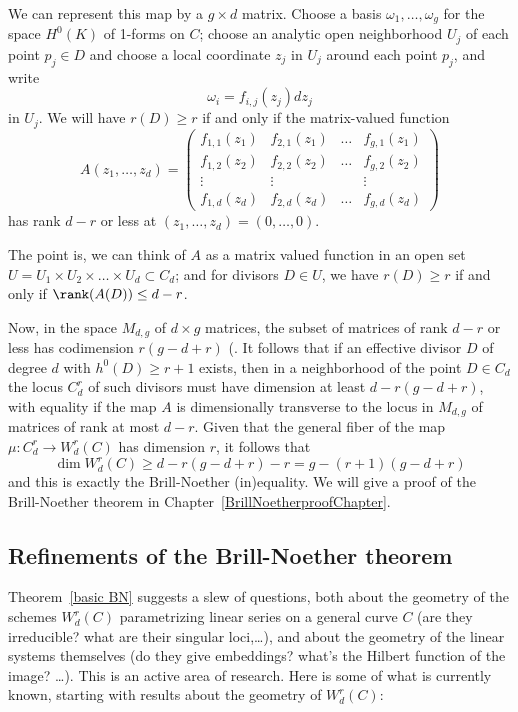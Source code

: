 We can represent this map by a $g \times d$ matrix. Choose a basis $\omega_1,\dots,\omega_g$ for the space $H^0(K)$ of 1-forms on $C$; choose an analytic open neighborhood $U_j$ of each point $p_j \in D$ and choose a local coordinate $z_j$ in $U_j$ around each point $p_j$, and write
$$
\omega_i = f_{i,j}(z_j)dz_j
$$
in $U_j$. We will have $r(D) \geq r$ if and only if the  matrix-valued function
$$
A(z_1,\dots,z_d) = 
\begin{pmatrix}
f_{1,1}(z_1) & f_{2,1}(z_1) & \dots & f_{g,1}(z_1) \\
f_{1,2}(z_2) & f_{2,2}(z_2) & \dots & f_{g,2}(z_2) \\
\vdots & \vdots &  & \vdots \\
f_{1,d}(z_d) & f_{2,d}(z_d) & \dots & f_{g,d} (z_d)
\end{pmatrix}
$$
has rank $d-r$ or less at $(z_1,\dots,z_d) = (0,\dots,0)$.

The point is, we can think of $A$ as a matrix valued function in an open set $U = U_1 \times U_2 \times \dots \times U_d \subset C_d$; and for divisors $D \in U$, we have $r(D) \geq r$ if and only if $\rank(A(D)) \leq d-r$. 

Now, in the space $M_{d,g}$ of $d \times g$ matrices, the subset of matrices of rank $d-r$ or less has codimension $r(g-d+r)$ (\cite[Exercise 10.9]{Eisenbud1995}. 
It follows 
that if  an effective divisor $D$ of degree $d$ with $h^0(D) \geq r+1$ exists, then in a neighborhood of the point $D \in C_d$ the locus $C^r_d$ of such divisors must have dimension at least $d - r(g-d+r)$, with equality if the map $A$ is dimensionally transverse to the locus in $M_{d,g}$ of matrices of rank at most $d-r$. Given that the general fiber of the map $\mu : C^r_d \to W^r_d(C)$ has dimension $r$, it follows that 
$$
\dim W^r_d(C) \geq d - r(g-d+r) - r = g - (r+1)(g-d+r)
$$
and this is exactly the  Brill-Noether (in)equality. We will give a proof of the Brill-Noether theorem in Chapter~\ref{BrillNoetherproofChapter}.


\subsection{Refinements of the Brill-Noether theorem}

Theorem~\ref{basic BN} suggests a slew of questions, both about the geometry of the schemes $W^r_d(C)$ parametrizing linear series on a general curve $C$ (are they irreducible? what are their singular loci,\dots), and about the geometry of the linear systems themselves (do they give embeddings? what's the Hilbert function of the image? \dots). This is an active area of research. Here is some of what is currently known, starting with results about the geometry of $W^r_d(C)$:

